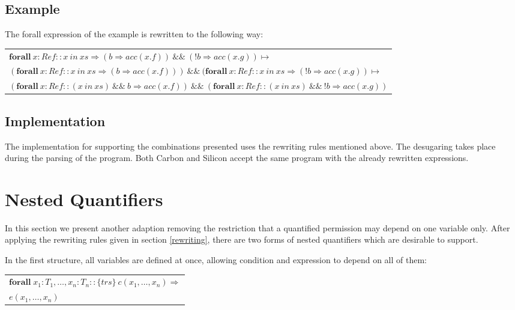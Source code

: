 \documentclass[12pt]{article}
\begin{document}
\subsection{Example}
The forall expression of the example is rewritten to the following way: \\

\begin{tabularx}{1\textwidth}{ X }
\(\mathbf{forall\ } x:Ref :: x\ in\ xs \Rightarrow (b \Rightarrow  acc(x.f)) \:\&\&\ (!b \Rightarrow acc(x.g)) \mapsto \) \\
\((\mathbf{forall\ } x:Ref :: x\ in\ xs \Rightarrow (b \Rightarrow  acc(x.f))) \:\&\&\ (\mathbf{forall\ } x:Ref :: x\ in\ xs \Rightarrow (!b \Rightarrow acc(x.g)) \mapsto \) \\
\((\mathbf{forall\ } x:Ref :: (x\ in\ xs)  \:\&\&\ b \Rightarrow acc(x.f)) \:\&\&\ (\mathbf{forall\ } x:Ref :: (x\ in\ xs)  \:\&\&\ !b \Rightarrow  acc(x.g)) \) \\
\end{tabularx}


\subsection{Implementation}
The implementation for supporting the combinations presented uses the rewriting rules mentioned above. The desugaring takes place during the parsing of the program. Both Carbon and Silicon accept the same program with the already rewritten expressions.

\section{Nested Quantifiers}
In this section we present another adaption removing the restriction that a quantified permission may depend on one variable only. After applying the rewriting rules given in section \ref{rewriting}, there are two forms of nested quantifiers which are desirable to support.

In the first structure, all variables are defined at once, allowing condition and expression to depend on all of them:\\

\begin{tabularx}{1\textwidth}{ X }
	\( \mathbf{forall} \; x_1:T_1, \dots, x_n: T_n ::  \{trs\}\ c(x_1, \dots, x_n) \Rightarrow \) \\
	\(e(x_1,  \dots, x_n)\)
\end{tabularx}\\
\end{document}
